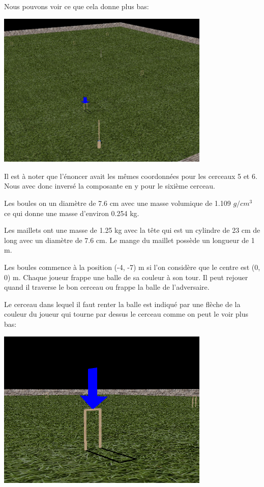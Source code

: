 \documentclass{article}
\begin{document}
Nous pouvons voir ce que cela donne plus bas:

\includegraphics[width=4in]{field.png}

Il est à noter que l'énoncer avait les mêmes coordonnées pour les
cerceaux 5 et 6. Nous avec donc inversé la composante en y pour le
sixième cerceau.

Les boules on un diamètre de 7.6 cm avec une masse volumique de 1.109
$g / cm^3$ ce qui donne une masse d'environ 0.254 kg.

Les maillets ont une masse de 1.25 kg avec la tête qui est un cylindre
de 23 cm de long avec un diamètre de 7.6 cm. Le mange du maillet
possède un longueur de 1 m.

Les boules commence à la position (-4, -7) m si l'on considère que le
centre est (0, 0) m. Chaque joueur frappe une balle de sa couleur à son
tour. Il peut rejouer quand il traverse le bon cerceau ou frappe la
balle de l'adversaire.

Le cerceau dans lequel il faut renter la balle est indiqué par une
flèche de la couleur du joueur qui tourne par dessus le cerceau comme
on peut le voir plus bas:

\includegraphics[width=4in]{goal.png}
\end{document}
